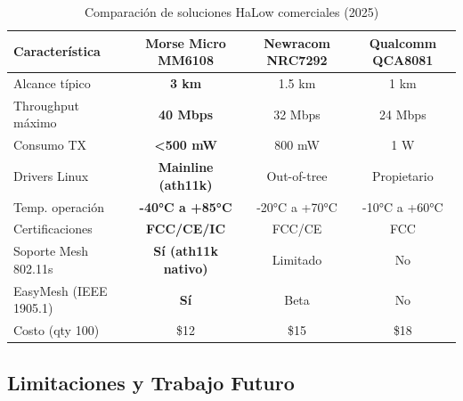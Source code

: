 \begin{table}[h]
\centering
\begin{tabular}{|l|c|c|c|}
\hline
\textbf{Característica} & \textbf{Morse Micro MM6108} & \textbf{Newracom NRC7292} & \textbf{Qualcomm QCA8081} \\
\hline
Alcance típico & \textbf{3 km} & 1.5 km & 1 km \\
Throughput máximo & \textbf{40 Mbps} & 32 Mbps & 24 Mbps \\
Consumo TX & \textbf{<500 mW} & 800 mW & 1 W \\
Drivers Linux & \textbf{Mainline (ath11k)} & Out-of-tree & Propietario \\
Temp. operación & \textbf{-40°C a +85°C} & -20°C a +70°C & -10°C a +60°C \\
Certificaciones & \textbf{FCC/CE/IC} & FCC/CE & FCC \\
Soporte Mesh 802.11s & \textbf{Sí (ath11k nativo)} & Limitado & No \\
EasyMesh (IEEE 1905.1) & \textbf{Sí} & Beta & No \\
Costo (qty 100) & \$12 & \$15 & \$18 \\
\hline
\end{tabular}
\caption{Comparación de soluciones HaLow comerciales (2025)}
\end{table}

\subsection{Limitaciones y Trabajo Futuro}


